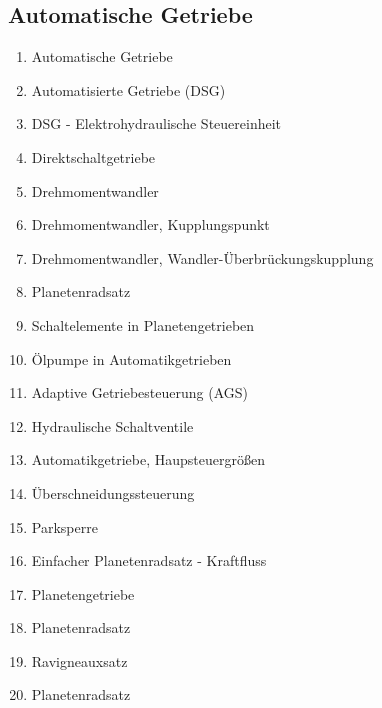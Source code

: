 \subsection{Automatische Getriebe}\label{automatische-getriebe}

\begin{enumerate}
\item
  Automatische Getriebe\\
\item
  Automatisierte Getriebe (DSG)\\
\item
  DSG - Elektrohydraulische Steuereinheit\\
\item
  Direktschaltgetriebe\\
\item
  Drehmomentwandler\\
\item
  Drehmomentwandler, Kupplungspunkt\\
\item
  Drehmomentwandler, Wandler-Überbrückungskupplung\\
\item
  Planetenradsatz\\
\item
  Schaltelemente in Planetengetrieben\\
\item
  Ölpumpe in Automatikgetrieben\\
\item
  Adaptive Getriebesteuerung (AGS)\\
\item
  Hydraulische Schaltventile\\
\item
  Automatikgetriebe, Haupsteuergrößen\\
\item
  Überschneidungssteuerung\\
\item
  Parksperre\\
\item
  Einfacher Planetenradsatz - Kraftfluss\\
\item
  Planetengetriebe\\
\item
  Planetenradsatz\\
\item
  Ravigneauxsatz\\
\item
  Planetenradsatz\\

\end{enumerate}
